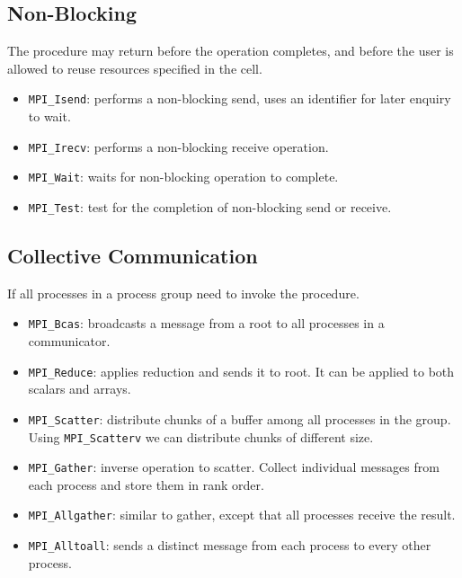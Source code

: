 \subsection*{Non-Blocking}
The procedure may return before the operation completes, and before the user is allowed to reuse resources specified in the cell.
\begin{itemize}
    \item \texttt{MPI\_Isend}: performs a non-blocking send, uses an identifier for later enquiry to wait.
    \item \texttt{MPI\_Irecv}: performs a non-blocking receive operation.
    \item \texttt{MPI\_Wait}: waits for non-blocking operation to complete.
    \item \texttt{MPI\_Test}: test for the completion of non-blocking send or receive.
\end{itemize}

\subsection{Collective Communication}
If all processes in a process group need to invoke the procedure.
\begin{itemize}
    \item \texttt{MPI\_Bcas}: broadcasts a message from a root to all processes in a communicator.
    \item \texttt{MPI\_Reduce}: applies reduction and sends it to root.
        It can be applied to both scalars and arrays.
    \item \texttt{MPI\_Scatter}: distribute chunks of a buffer among all processes in the group.
        Using \texttt{MPI\_Scatterv} we can distribute chunks of different size.
    \item \texttt{MPI\_Gather}: inverse operation to scatter.
        Collect individual messages from each process and store them in rank order.
    \item \texttt{MPI\_Allgather}: similar to gather, except that all processes receive the result.
    \item \texttt{MPI\_Alltoall}: sends a distinct message from each process to every other process.
\end{itemize}
